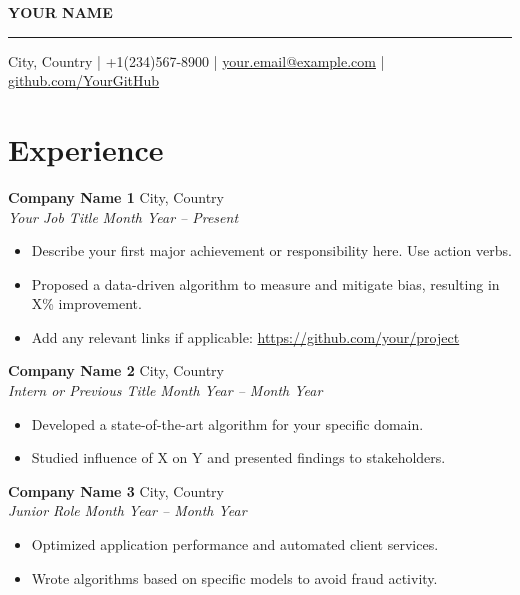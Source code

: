 \documentclass[a4paper,10pt]{article}
\begin{document}
\pagestyle{empty} %

\begin{center}
    {\huge \textbf{YOUR NAME}} \\ %
    \vspace{4pt}
    \hrule
    \vspace{6pt}
    {\small
    City, Country \quad|\quad 
    +1(234)567-8900 \quad|\quad 
    \href{mailto:your.email@example.com}{your.email@example.com} \quad|\quad 
    \href{https://github.com/YourGitHub}{github.com/YourGitHub}
    }
\end{center}

\section*{Experience}
\noindent
\textbf{Company Name 1} \hfill City, Country \\
\textit{Your Job Title} \hfill \textit{Month Year -- Present}
\begin{itemize}[leftmargin=*, noitemsep, topsep=0pt]
    \item Describe your first major achievement or responsibility here. Use action verbs.
    \item Proposed a data-driven algorithm to measure and mitigate bias, resulting in X\% improvement.
    \item Add any relevant links if applicable: \url{https://github.com/your/project}
\end{itemize}

\vspace{0.8em}
\noindent
\textbf{Company Name 2} \hfill City, Country \\
\textit{Intern or Previous Title} \hfill \textit{Month Year -- Month Year}
\begin{itemize}[leftmargin=*, noitemsep, topsep=0pt]
    \item Developed a state-of-the-art algorithm for your specific domain.
    \item Studied influence of X on Y and presented findings to stakeholders.
\end{itemize}

\vspace{0.8em}
\noindent
\textbf{Company Name 3} \hfill City, Country \\
\textit{Junior Role} \hfill \textit{Month Year -- Month Year}
\begin{itemize}[leftmargin=*, noitemsep, topsep=0pt]
    \item Optimized application performance and automated client services.
    \item Wrote algorithms based on specific models to avoid fraud activity.
\end{itemize}
\end{document}
